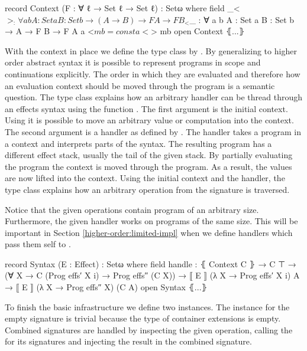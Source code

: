 \begin{code}
record Context (F : ∀ {ℓ} → Set ℓ → Set ℓ) : Setω where
  field _<$>_ : ∀ {a b} {A : Set a} {B : Set b} → (A → B) → F A → F B
  _<$_ : ∀ {a b} {A : Set a} {B : Set b} → A → F B → F A
  a <$ mb = const a <$> mb
open Context ⦃...⦄
\end{code}
With the context in place we define the  type class by
\citeauthor{DBLP:conf/haskell/WuSH14}.
By generalizing to higher order abstract syntax it is possible to represent
programs in scope and continuations explicitly.
The order in which they are evaluated and therefore how an evaluation context
should be moved through the program is a semantic question.
The type class explains how an arbitrary handler can be thread through an
effects syntax using the function .
The first argument is the initial context.
Using \AgdaFunction{<\$} it is possible to move an arbitrary value or
computation into the context.
The second argument is a handler as defined by
\citeauthor{DBLP:conf/haskell/WuSH14}.
The handler takes a program in a context and interprets parts of the syntax.
The resulting program has a different effect stack, usually the tail of the
given stack.
By partially evaluating the program the context is moved through the
program.
As a result, the values are now lifted into the context.
Using the initial context and the handler, the type class explains how an
arbitrary operation from the signature  is traversed.

Notice that the given operations contain program of an arbitrary size.
Furthermore, the given handler works on programs of the same size.
This will be important in Section \ref{higher-order:limited-impl} when we define
handlers which pass them self to .

\begin{code}
record Syntax (E : Effect) : Setω where
  field handle : ⦃ Context C ⦄ → C ⊤ →
          (∀ {X} → C (Prog effs′ X {i}) → Prog effs″ (C X)) →
          ⟦ E ⟧ (λ X → Prog effs′ X {i}) A → ⟦ E ⟧ (λ X → Prog effs″ X) (C A)
open Syntax ⦃...⦄
\end{code}
To finish the basic infrastructure we define two 
instances.
The instance for the empty signature  is trivial because the
type of container extensions is empty.
Combined signatures are handled by inspecting the given operation, calling the
 for its signatures and injecting the result in the
combined signature.

